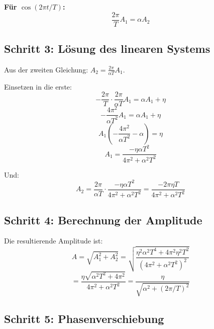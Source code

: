 \documentclass[a4paper, 12pt, twoside, openright]{report}
\theoremstyle{definition}
\theoremstyle{definition}
\begin{document}
\textbf{Für $\cos(2\pi t / T)$:}
\begin{equation}
    \frac{2\pi}{T} A_1 = \alpha A_2
\end{equation}

\subsection{Schritt 3: Lösung des linearen Systems}

Aus der zweiten Gleichung: $A_2 = \frac{2\pi}{\alpha T} A_1$.

Einsetzen in die erste:
\begin{equation}
    -\frac{2\pi}{T} \cdot \frac{2\pi}{\alpha T} A_1 = \alpha A_1 + \eta
\end{equation}
\begin{equation}
    -\frac{4\pi^2}{\alpha T^2} A_1 = \alpha A_1 + \eta
\end{equation}
\begin{equation}
    A_1 \left(-\frac{4\pi^2}{\alpha T^2} - \alpha\right) = \eta
\end{equation}
\begin{equation}
    A_1 = \frac{-\eta \alpha T^2}{4\pi^2 + \alpha^2 T^2}
\end{equation}

Und:
\begin{equation}
    A_2 = \frac{2\pi}{\alpha T} \cdot \frac{-\eta \alpha T^2}{4\pi^2 + \alpha^2 T^2} = \frac{-2\pi \eta T}{4\pi^2 + \alpha^2 T^2}
\end{equation}

\subsection{Schritt 4: Berechnung der Amplitude}

Die resultierende Amplitude ist:
\begin{equation}
    A = \sqrt{A_1^2 + A_2^2} = \sqrt{\frac{\eta^2 \alpha^2 T^4 + 4\pi^2 \eta^2 T^2}{(4\pi^2 + \alpha^2 T^2)^2}}
\end{equation}
\begin{equation}
    = \frac{\eta\sqrt{\alpha^2 T^2 + 4\pi^2}}{4\pi^2 + \alpha^2 T^2} = \frac{\eta}{\sqrt{\alpha^2 + (2\pi/T)^2}}
\end{equation}

\subsection{Schritt 5: Phasenverschiebung}
\end{document}
